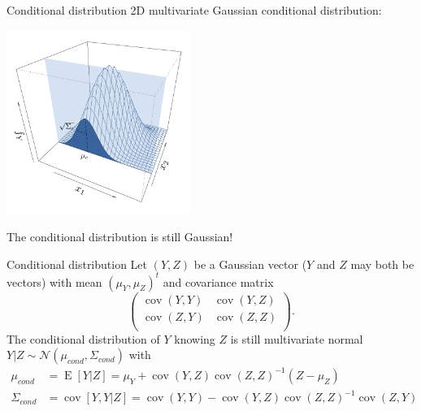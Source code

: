 \documentclass{beamer}
\DeclareMathOperator*{\E}{E}
\DeclareMathOperator*{\Cov}{cov}
\begin{document}
\begin{frame}{}
\begin{block}{Conditional distribution}
2D multivariate Gaussian conditional distribution:\\
\begin{center}
\includegraphics[height=6cm]{figures/ch1_condpdf1}
\end{center}
The conditional distribution is still Gaussian!
\end{block}
\end{frame}

\begin{frame}{}
\begin{block}{Conditional distribution}
Let $(Y,Z)$ be a Gaussian vector ($Y$ and $Z$ may both be vectors) with mean $(\mu_Y,\mu_Z)^t$ and covariance matrix
\begin{equation*}
\begin{pmatrix}
	\Cov(Y,Y) & \Cov(Y,Z)\\
	\Cov(Z,Y) & \Cov(Z,Z)\\
\end{pmatrix}.
\end{equation*}
The conditional distribution of $Y$ knowing $Z$ is still multivariate normal $Y|Z \sim \mathcal{N}(\mu_{cond},\Sigma_{cond})$ with
\begin{equation*}
\begin{split}
	\mu_{cond} &= \E [Y|Z] = \mu_Y + \Cov(Y,Z) \Cov(Z,Z)^{-1} (Z-\mu_Z)\\
	\Sigma_{cond} &= \Cov [Y,Y|Z] = \Cov(Y,Y) - \Cov(Y,Z) \Cov(Z,Z)^{-1} \Cov(Z,Y)
\end{split}
\end{equation*}
\end{block}
\end{frame}
\end{document}
